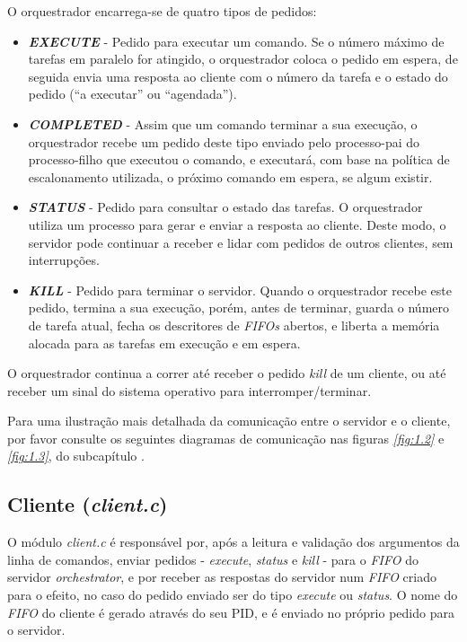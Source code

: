 \documentclass[a4paper,11pt]{scrreprt}
\begin{document}
            O orquestrador encarrega-se de quatro tipos de pedidos:
            \begin{itemize}
                \item \textit{\textbf{EXECUTE}} - Pedido para executar um comando.
                    Se o número máximo de tarefas em paralelo for atingido,
                    o orquestrador coloca o pedido em espera,
                    de seguida envia uma resposta ao cliente com o número da tarefa
                    e o estado do pedido (“a executar” ou “agendada”).

                \item \textit{\textbf{COMPLETED}} - Assim que um comando terminar a sua execução,
                    o orquestrador recebe um pedido deste tipo enviado pelo processo-pai do processo-filho
                    que executou o comando, e executará, com base na política de escalonamento utilizada,
                    o próximo comando em espera, se algum existir.

                \item \textit{\textbf{STATUS}} - Pedido para consultar o estado das tarefas.
                    O orquestrador utiliza um processo para gerar e enviar a resposta ao cliente.
                    Deste modo, o servidor pode continuar a receber e lidar com pedidos de outros
                    clientes, sem interrupções.

                \item \textit{\textbf{KILL}} - Pedido para terminar o servidor.
                    Quando o orquestrador recebe este pedido,
                    termina a sua execução, porém, antes de terminar,
                    guarda o número de tarefa atual,
                    fecha os descritores de \textit{FIFOs} abertos,
                    e liberta a memória alocada para as tarefas em execução e em espera.
            \end{itemize}
            O orquestrador continua a correr até receber o pedido \textit{kill} de um cliente,
            ou até receber um sinal do sistema operativo para interromper/terminar.

            Para uma ilustração mais detalhada da comunicação entre o servidor e o cliente,
            por favor consulte os seguintes diagramas de comunicação nas figuras
            \textit{\ref{fig:1.2}} e \textit{\ref{fig:1.3}}, do subcapítulo \textit{}.

        \subsection{Cliente (\textit{client.c})}
            O módulo \textit{client.c} é responsável por, após a leitura e validação dos argumentos da linha de comandos,
            enviar pedidos - \textit{execute}, \textit{status} e \textit{kill} - para o \textit{FIFO} do
            servidor \textit{orchestrator}, e por receber as respostas do servidor num \textit{FIFO} criado para o efeito,
            no caso do pedido enviado ser do tipo \textit{execute} ou \textit{status}. O nome do \textit{FIFO} do cliente
            é gerado através do seu PID, e é enviado no próprio pedido para o servidor.
\end{document}
